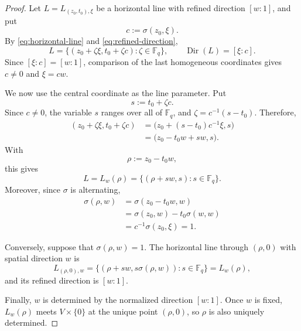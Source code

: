 \documentclass[11pt,letterpaper]{amsart}
\numberwithin{equation}{section}
\theoremstyle{definition}
\theoremstyle{remark}
\newcommand{\Fq}{\mathbb F_q}
\newcommand{\Dir}{\operatorname{Dir}}
\begin{document}
\begin{proof}
Let $L=L_{(z_0,t_0),\xi}$ be a horizontal line with refined direction
$[w:1]$, and put
\[
 c:=\sigma(z_0,\xi).
\]
By \eqref{eq:horizontal-line} and \eqref{eq:refined-direction},
\[
 L
 =
 \bigl\{(z_0+\zeta\xi,t_0+\zeta c):\zeta\in\Fq\bigr\},
 \qquad
 \Dir(L)=[\xi:c].
\]
Since $[\xi:c]=[w:1]$, comparison of the last homogeneous coordinates gives $c\neq0$ and $\xi=cw$.

We now use the central coordinate as the line parameter.  Put
\[
 s:=t_0+\zeta c.
\]
Since $c\neq0$, the variable $s$ ranges over all of $\Fq$, and
$\zeta=c^{-1}(s-t_0)$.  Therefore,
\begin{align*}
 (z_0+\zeta\xi,t_0+\zeta c)
 &=\bigl(z_0+(s-t_0)c^{-1}\xi,s\bigr)\\
 &=\bigl(z_0-t_0w+sw,s\bigr).
\end{align*}
With
\[
 \rho:=z_0-t_0w,
\]
this gives
\begin{equation}\label{eq:normalized-line}
 L=L_w(\rho)
 =
 \bigl\{(\rho+sw,s):s\in\Fq\bigr\}.
\end{equation}
Moreover, since $\sigma$ is alternating,
\begin{align*}
 \sigma(\rho,w)
 &=\sigma(z_0-t_0w,w)\\
 &=\sigma(z_0,w)-t_0\sigma(w,w)\\
 &=c^{-1}\sigma(z_0,\xi)
 =1.
\end{align*}

Conversely, suppose that $\sigma(\rho,w)=1$.  The horizontal line through
$(\rho,0)$ with spatial direction $w$ is
\[
 L_{(\rho,0),w}
 =
 \bigl\{(\rho+sw,s\sigma(\rho,w)):s\in\Fq\bigr\}
 =L_w(\rho),
\]
and its refined direction is $[w:1]$.

Finally, $w$ is determined by the normalized direction $[w:1]$. Once
$w$ is fixed, $L_w(\rho)$ meets $V\times\{0\}$ at the unique point
$(\rho,0)$, so $\rho$ is also uniquely determined.
\end{proof}
\end{document}
